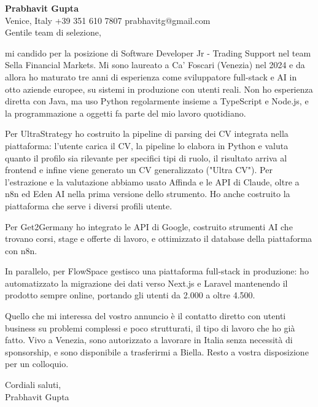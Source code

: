\documentclass[a4paper,10.5pt]{article}
\begin{document}
\textbf{Prabhavit Gupta}\\
Venice, Italy \textbar{} +39 351 610 7807 \textbar{} prabhavitg@gmail.com\\[10pt]
Gentile team di selezione,

mi candido per la posizione di Software Developer Jr - Trading Support nel team Sella Financial Markets. Mi sono laureato a Ca' Foscari (Venezia) nel 2024 e da allora ho maturato tre anni di esperienza come sviluppatore full-stack e AI in otto aziende europee, su sistemi in produzione con utenti reali. Non ho esperienza diretta con Java, ma uso Python regolarmente insieme a TypeScript e Node.js, e la programmazione a oggetti fa parte del mio lavoro quotidiano.

Per UltraStrategy ho costruito la pipeline di parsing dei CV integrata nella piattaforma: l'utente carica il CV, la pipeline lo elabora in Python e valuta quanto il profilo sia rilevante per specifici tipi di ruolo, il risultato arriva al frontend e infine viene generato un CV generalizzato ("Ultra CV"). Per l'estrazione e la valutazione abbiamo usato Affinda e le API di Claude, oltre a n8n ed Eden AI nella prima versione dello strumento. Ho anche costruito la piattaforma che serve i diversi profili utente.

Per Get2Germany ho integrato le API di Google, costruito strumenti AI che trovano corsi, stage e offerte di lavoro, e ottimizzato il database della piattaforma con n8n.

In parallelo, per FlowSpace gestisco una piattaforma full-stack in produzione: ho automatizzato la migrazione dei dati verso Next.js e Laravel mantenendo il prodotto sempre online, portando gli utenti da 2.000 a oltre 4.500.

Quello che mi interessa del vostro annuncio è il contatto diretto con utenti business su problemi complessi e poco strutturati, il tipo di lavoro che ho già fatto. Vivo a Venezia, sono autorizzato a lavorare in Italia senza necessità di sponsorship, e sono disponibile a trasferirmi a Biella. Resto a vostra disposizione per un colloquio.

Cordiali saluti,\\
Prabhavit Gupta
\end{document}
